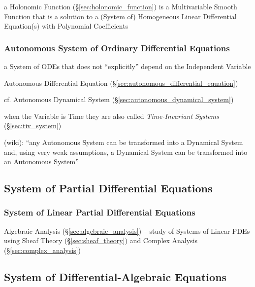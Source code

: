 a Holonomic Function (\S\ref{sec:holonomic_function}) is a Multivariable Smooth
Function that is a solution to a (System of) Homogeneous Linear Differential
Equation(s) with Polynomial Coefficients



\subsubsection{Autonomous System of Ordinary Differential Equations}
\label{sec:autonomous_ode_system}

a System of ODEs that does not ``explicitly'' depend on the Independent Variable

Autonomous Differential Equation (\S\ref{sec:autonomous_differential_equation})

cf. Autonomous Dynamical System (\S\ref{sec:autonomous_dynamical_system})

when the Variable is Time they are also called \emph{Time-Invariant Systems}
(\S\ref{sec:tiv_system})

(wiki): ``any Autonomous System can be transformed into a Dynamical System and,
using very weak assumptions, a Dynamical System can be transformed into an
Autonomous System''



\subsection{System of Partial Differential Equations}\label{sec:pde_system}

\subsubsection{System of Linear Partial Differential Equations}
\label{sec:linear_pde_system}

\fist Algebraic Analysis (\S\ref{sec:algebraic_analysis}) -- study of Systems of
Linear PDEs using Sheaf Theory (\S\ref{sec:sheaf_theory}) and Complex Analysis
(\S\ref{sec:complex_analysis})



\subsection{System of Differential-Algebraic Equations}\label{sec:dae_system}

